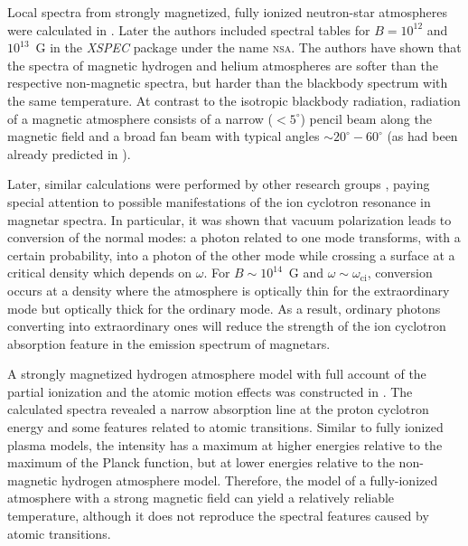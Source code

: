 \documentclass{pos1}
\newcommand{\omci}{\omega_\mathrm{ci}}
\begin{document}
Local spectra from strongly magnetized, fully ionized neutron-star
atmospheres  were calculated in \cite{Shibanov_ea92,Zavlin_ea95}.
Later the authors
included spectral tables for $B=10^{12}$ and $10^{13}$~G
in the \textit{XSPEC} package \cite{XSPEC} under the name \textsc{nsa}.
 The authors have shown that the spectra of magnetic
hydrogen and helium atmospheres are softer than the respective
non-magnetic spectra, but harder than the blackbody spectrum with the
same temperature. At contrast to
the isotropic blackbody radiation, radiation of a magnetic atmosphere
consists of a narrow ($<5^\circ$) pencil beam along the magnetic field
and a broad fan beam with typical angles  $\sim20^\circ-60^\circ$ (as
had been already predicted in \cite{GnedinSunyaev74}).

Later, similar calculations were performed by other research groups
\cite{Zane_ea01,HoLai03,vanAdelsbergLai}, paying special attention
to possible manifestations of the ion cyclotron resonance in magnetar
spectra. In particular, it was shown
\cite{LaiHo02,HoLai03,vanAdelsbergLai}
that vacuum polarization leads to conversion of the normal modes: a
photon related to one mode transforms, with a certain probability, into
a photon of the other mode while crossing a surface at a
critical density which depends on $\omega$. For $B\sim10^{14}$~G and
$\omega\sim\omci$, conversion occurs at a density where the atmosphere is
optically thin for the extraordinary mode but optically thick for the
ordinary mode. As a result, ordinary photons converting into extraordinary
ones will reduce the strength of the ion cyclotron absorption feature in the
emission spectrum of magnetars.

A strongly magnetized hydrogen atmosphere model with full account of
the partial ionization and the atomic motion effects was constructed
in \cite{KK}. The calculated spectra revealed a narrow absorption line
at the proton cyclotron energy and some features related to atomic
transitions. Similar to fully ionized plasma models, the
intensity has a maximum at higher energies relative to the maximum of
the Planck function, but at lower energies relative to the non-magnetic
hydrogen atmosphere model. Therefore, the model of a fully-ionized
atmosphere with a strong magnetic field can yield a relatively reliable
temperature, although it does not reproduce the spectral features
caused by atomic transitions.
\end{document}

